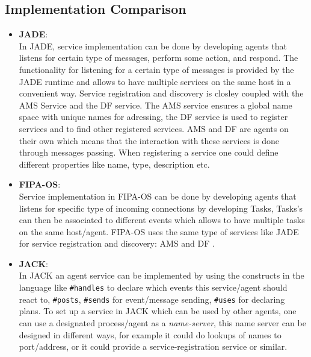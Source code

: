 \documentclass[paper=letter, fontsize=12pt]{article}
\begin{document}
\subsection{Implementation Comparison}
\begin{itemize}
\item \textbf{JADE}: \\
In JADE, service implementation can be done by developing agents that listens for certain type of messages, perform some action, and respond. The functionality for listening for a certain type of messages is provided by the JADE runtime and allows to have multiple services on the same host in a convenient way. Service registration and discovery is closley coupled with the AMS Service and the DF service. The AMS service ensures a global name space with unique names for adressing, the DF service is used to register services and to find other registered services. AMS and DF are agents on their own which means that the interaction with these services is done through messages passing. When registering a service one could define different properties like name, type, description etc. 
\item \textbf{FIPA-OS}: \\
Service implementation in FIPA-OS can be done by developing agents that listens for specific type of incoming connections by developing Tasks, Tasks's can then be associated to different events which allows to have multiple tasks on the same host/agent. FIPA-OS uses the same type of services like JADE for service registration and discovery: AMS and DF \citep{fipa-os-2}.
\item \textbf{JACK}: \\
In JACK an agent service can be implemented by using the constructs in the language like \texttt{\#handles} to declare which events this service/agent should react to, \texttt{\#posts}, \texttt{\#sends} for event/message sending, \texttt{\#uses} for declaring plans. To set up a service in JACK which can be used by other agents, one can use a designated process/agent as a \textit{name-server}, this name server can be designed in different ways, for example it could do lookups of names to port/address, or it could provide a service-registration service or similar. \citep{jack-2}
\end{itemize}
\end{document}

